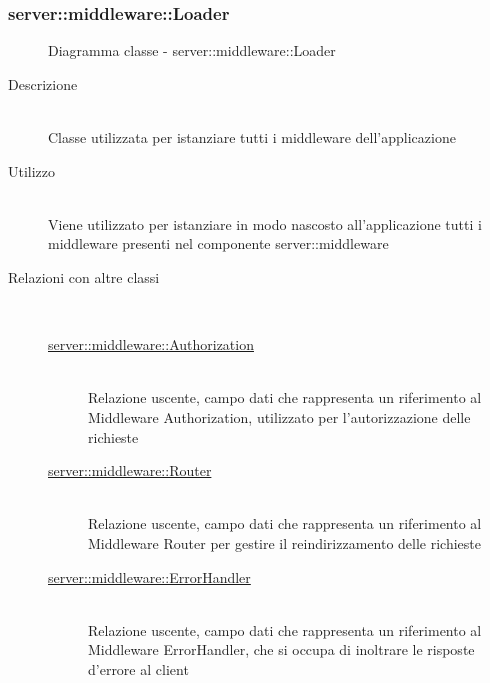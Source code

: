 \vspace{0.5cm}
\hypertarget{server::middleware::Loader}{}
\subsubsection[Loader]{server::middleware::Loader}
\begin{figure}[H]
	\centering
	\caption{Diagramma classe - server::middleware::Loader}
\end{figure}\begin{description}
\item[Descrizione] \hfill \\
Classe utilizzata per istanziare tutti i middleware dell'applicazione
\item[Utilizzo] \hfill \\
Viene utilizzato per istanziare in modo nascosto all’applicazione tutti i middleware presenti nel componente server::middleware
\item[Relazioni con altre classi] \hfill \\
\vspace{-7mm}
\begin{description}
	\item[\hyperlink{server::middleware::Authorization}{server::middleware::Authorization}] \hfill \\
	Relazione uscente, campo dati che rappresenta un riferimento al Middleware Authorization, utilizzato per l'autorizzazione delle richieste
	\item[\hyperlink{server::middleware::Router}{server::middleware::Router}] \hfill \\
	Relazione uscente, campo dati che rappresenta un riferimento al Middleware Router per gestire il reindirizzamento delle richieste
	\item[\hyperlink{server::middleware::ErrorHandler}{server::middleware::ErrorHandler}] \hfill \\
	Relazione uscente, campo dati che rappresenta un riferimento al Middleware ErrorHandler, che si occupa di inoltrare le risposte d'errore al client
\end{description}


\end{description}
